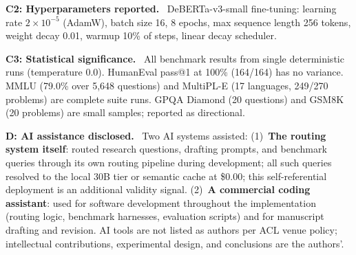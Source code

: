 \documentclass[11pt]{article}
\begin{document}
\textbf{C2: Hyperparameters reported.} \checkmark~DeBERTa-v3-small
fine-tuning: learning rate $2 \times 10^{-5}$ (AdamW), batch size 16,
8 epochs, max sequence length 256 tokens, weight decay 0.01, warmup
10\% of steps, linear decay scheduler.

\textbf{C3: Statistical significance.} \checkmark~All benchmark results
from single deterministic runs (temperature 0.0). HumanEval pass@1 at
100\% (164/164) has no variance. MMLU (79.0\% over 5,648 questions) and
MultiPL-E (17 languages, 249/270 problems) are complete suite runs.
GPQA Diamond (20 questions) and GSM8K (20 problems) are small samples;
reported as directional.

\textbf{D: AI assistance disclosed.} \checkmark~Two AI systems assisted:
(1)~\textbf{The routing system itself}: routed research questions,
drafting prompts, and benchmark queries through its own routing pipeline
during development; all such queries resolved to the local 30B tier or
semantic cache at \$0.00; this self-referential deployment is an
additional validity signal.
(2)~\textbf{A commercial coding assistant}: used for software development
throughout the implementation (routing logic, benchmark harnesses,
evaluation scripts) and for manuscript drafting and revision. AI tools
are not listed as authors per ACL venue policy; intellectual
contributions, experimental design, and conclusions are the authors'.
\end{document}
